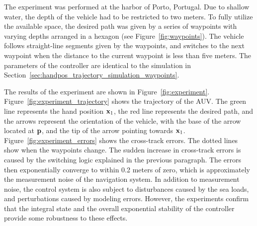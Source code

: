 
The experiment was performed at the harbor of Porto, Portugal.
Due to shallow water, the depth of the vehicle had to be restricted to two meters.
To fully utilize the available space, the desired path was given by a series of waypoints with varying depths arranged in a hexagon (see Figure~\ref{fig:waypoints}).
The vehicle follows straight-line segments given by the waypoints, and switches to the next waypoint when the distance to the current waypoint is less than five meters.
The parameters of the controller are identical to the simulation in Section~\ref{sec:handpos_trajectory_simulation_waypoints}.

The results of the experiment are shown in Figure~\ref{fig:experiment}.
Figure~\ref{fig:experiment_trajectory} shows the trajectory of the AUV.
The green line represents the hand position $\mathbf{x}_1$, the red line represents the desired path, and the arrows represent the orientation of the vehicle, with the base of the arrow located at $\mathbf{p}$, and the tip of the arrow pointing towards $\mathbf{x}_1$.
Figure~\ref{fig:experiment_errors} shows the cross-track errors.
The dotted lines show when the waypoints change.
The sudden increase in cross-track errors is caused by the switching logic explained in the previous paragraph.
The errors then exponentially converge to within 0.2 meters of zero, which is approximately the measurement noise of the navigation system.
In addition to measurement noise, the control system is also subject to disturbances caused by the sea loads, and perturbations caused by modeling errors.
However, the experiments confirm that the integral state and the overall exponential stability of the controller provide some robustness to these effects.

